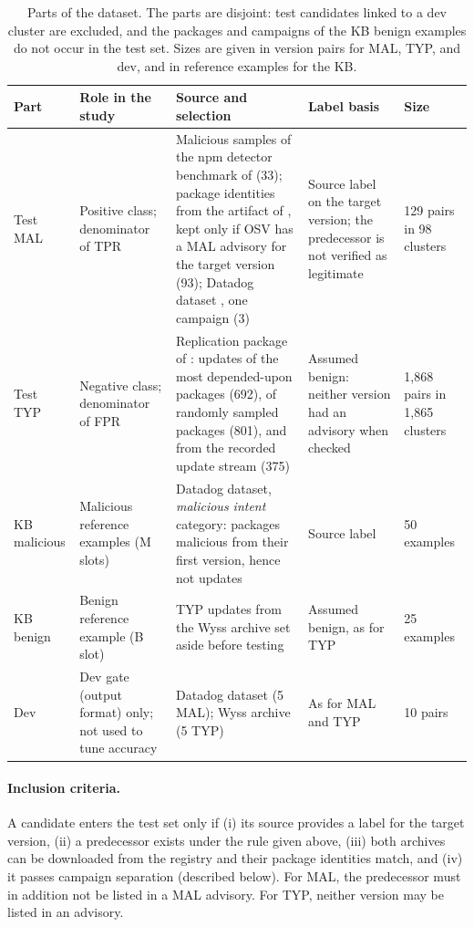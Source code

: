 \documentclass[a4paper,fleqn]{cas-dc}
\begin{document}
\begin{table}[t]
\centering\small
\caption{Parts of the dataset. The parts are disjoint: test candidates linked to
a dev cluster are excluded, and the packages and campaigns of the KB benign
examples do not occur in the test set. Sizes are given in version pairs for MAL,
TYP, and dev, and in reference examples for the KB.}
\label{tab:data}
\begin{tabularx}{\textwidth}{@{}L{1.55cm} L{3.1cm} Y L{3.3cm} L{1.75cm}@{}}
\toprule
Part & Role in the study & Source and selection & Label basis & Size \\
\midrule
Test MAL & Positive class; denominator of TPR &
Malicious samples of the npm detector benchmark of \citet{guo2026effective} (33);
package identities from the artifact of \citet{draz2026version}, kept only if
OSV \citep{osv} has a MAL advisory for the target version (93); Datadog
dataset \citep{datadog2023dataset}, one campaign (3) &
Source label on the target version; the predecessor is not verified as
legitimate &
129 pairs in 98 clusters \\
\addlinespace
Test TYP & Negative class; denominator of FPR &
Replication package of \citet{wyss2025evaluating}: updates of the most
depended-upon packages (692), of randomly sampled packages (801), and from the
recorded update stream (375) &
Assumed benign: neither version had an advisory when checked &
1,868 pairs in 1,865 clusters \\
\addlinespace
KB malicious & Malicious reference examples (M slots) &
Datadog dataset, \emph{malicious intent} category: packages malicious from
their first version, hence not updates &
Source label &
50 examples \\
\addlinespace
KB benign & Benign reference example (B slot) &
TYP updates from the Wyss archive set aside before testing &
Assumed benign, as for TYP &
25 examples \\
\addlinespace
Dev & Dev gate (output format) only; not used to tune accuracy &
Datadog dataset (5 MAL); Wyss archive (5 TYP) &
As for MAL and TYP &
10 pairs \\
\bottomrule
\end{tabularx}
\end{table}

\paragraph{Inclusion criteria.} A candidate enters the test set only if
(i) its source provides a label for the target version, (ii) a predecessor
exists under the rule given above, (iii) both archives can be downloaded from
the registry and their package identities match, and (iv) it passes campaign
separation (described below). For MAL, the predecessor must in addition not be
listed in a MAL advisory. For TYP, neither version may be listed in an
advisory.
\end{document}
